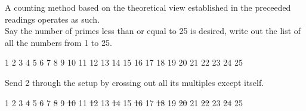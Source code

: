 \documentclass[12pt, letterpaper, twosided]{report}
\begin{document}
A counting method based on the theoretical view established in the preceeded readings operates as such. \\
Say the number of primes less than or equal to 25 is desired, write out the list of all the numbers from 1 to 25. \\
\begin{center}
1 \hspace{0.5cm}2 \hspace{0.5cm}3 \hspace{0.5cm}4 \hspace{0.5cm}5 \hspace{0.5cm}6 \hspace{0.5cm}7 \hspace{0.5cm}8 \hspace{0.5cm}9 \hspace{0.5cm}10 \hspace{0.5cm}11 \hspace{0.5cm}12 \hspace{0.5cm}13 \hspace{0.5cm}14 \hspace{0.5cm}15 \hspace{0.5cm}16 \hspace{0.5cm}17 \hspace{0.5cm}18 \hspace{0.5cm}19 \hspace{0.5cm}20 \hspace{0.5cm}21 \hspace{0.5cm}22 \hspace{0.5cm}23 \hspace{0.5cm}24 \hspace{0.5cm}25
\end{center}
Send 2 through the setup by crossing out all its multiples except itself.
\begin{center}
1 \hspace{0.5cm}2 \hspace{0.5cm}3 \hspace{0.5cm}\sout{4} \hspace{0.5cm}5 \hspace{0.5cm}\sout{6} \hspace{0.5cm}7 \hspace{0.5cm}\sout{8} \hspace{0.5cm}9 \hspace{0.5cm}\sout{10} \hspace{0.5cm}11 \hspace{0.5cm}\sout{12} \hspace{0.5cm}13 \hspace{0.5cm}\sout{14} \hspace{0.5cm}15 \hspace{0.5cm}\sout{16} \hspace{0.5cm}17 \hspace{0.5cm}\sout{18} \hspace{0.5cm}19 \hspace{0.5cm}\sout{20} \hspace{0.5cm}21 \hspace{0.5cm}\sout{22} \hspace{0.5cm}23 \hspace{0.5cm}\sout{24} \hspace{0.5cm}25
\end{center}
\end{document}
